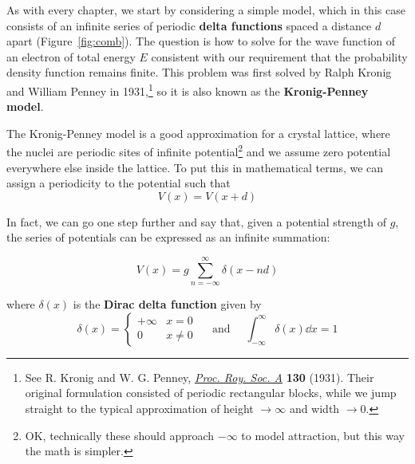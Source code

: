 As with every chapter, we start by considering a simple model, which in this case consists of an infinite series of periodic \textbf{delta functions} spaced a distance $d$ apart (Figure~\ref{fig:comb}). The question is how to solve for the wave function of an electron of total energy $E$ consistent with our requirement that the probability density function remains finite. This problem was first solved by Ralph Kronig and William Penney in 1931,\footnote{See R. Kronig and W. G. Penney, \href{http://rspa.royalsocietypublishing.org/content/130/814/499}{\emph{Proc. Roy. Soc. A}} \textbf{130} (1931). Their original formulation consisted of periodic rectangular blocks, while we jump straight to the typical approximation of height $\rightarrow\infty$ and width $\rightarrow0$.} so it is also known as the \textbf{Kronig-Penney model}.

The Kronig-Penney model is a good approximation for a crystal lattice, where the nuclei are periodic sites of infinite potential\footnote{OK, technically these should approach $-\infty$ to model attraction, but this way the math is simpler.} and we assume zero potential everywhere else inside the lattice. To put this in mathematical terms, we can assign a periodicity to the potential such that \begin{equation*}
	V(x) = V(x+d)
\end{equation*}

In fact, we can go one step further and say that, given a potential strength of $g$, the series of potentials can be expressed as an infinite summation:
\begin{tcolorbox}[title = Kronig-Penney model potential] \vspace{-2ex}
	\begin{equation}
	V(x) = g \sum_{n=-\infty}^{\infty} \delta(x - nd) \label{eq:kp-pot}
	\end{equation}
\end{tcolorbox}

where $\delta(x)$ is the \textbf{Dirac delta function} given by
\begin{equation*}
	\boxed{\delta(x) = \begin{cases}
		+\infty & x=0 \\ 0 & x \neq 0
	\end{cases} \quad \text{ and } \quad 
	\int_{-\infty}^{\infty} \delta(x) \dd{x} = 1}
\end{equation*}


